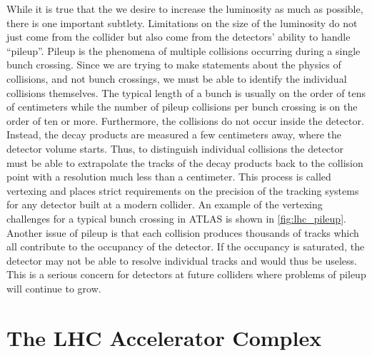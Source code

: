 While it is true that the we desire to increase the luminosity as much
as possible, there is one important subtlety. 
Limitations on the size of the luminosity do not just
come from the collider but also come from the detectors' ability to 
handle ``pileup''.
Pileup is the phenomena of multiple collisions occurring during a single
bunch crossing. Since we are trying to make statements about the 
physics of collisions, and not bunch crossings, we must be able to 
identify the individual collisions themselves. The typical length of 
a bunch is usually on the order of tens of centimeters while the number of pileup 
collisions per bunch crossing is on the order of ten or more. Furthermore, 
the collisions do not occur inside the detector. Instead, the decay products
are measured a few centimeters away, where the detector volume starts. 
Thus, to distinguish individual
collisions the detector must be able to extrapolate the tracks of the decay
products back to the collision point with a resolution much less than 
a centimeter. This process is called vertexing and places strict 
requirements on the precision of the tracking systems for any detector
built at a modern collider. An example of the vertexing challenges for a typical
bunch crossing in ATLAS is shown in \fig\ref{fig:lhc_pileup}.
Another issue of pileup is that each collision produces thousands of 
tracks which all contribute to the occupancy of the detector. If the occupancy
is saturated, the detector may not be able to resolve individual tracks
and would thus be useless. This is a serious concern for detectors
at future colliders where problems of pileup will continue to grow.


\section{The LHC Accelerator Complex}


